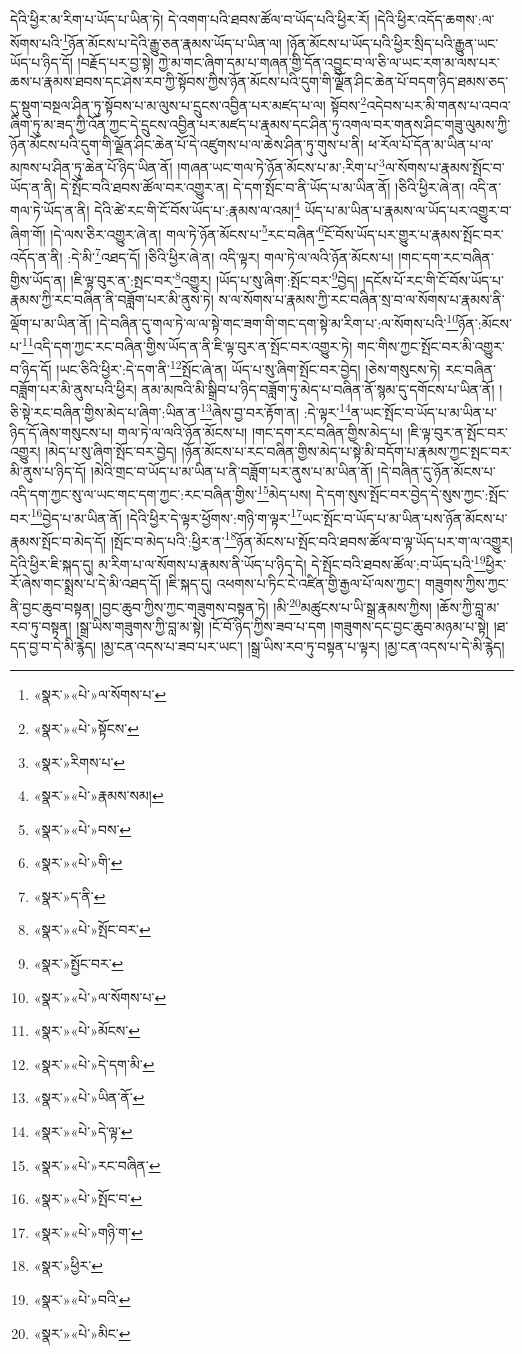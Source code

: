 དེའི་ཕྱིར་མ་རིག་པ་ཡོད་པ་ཡིན་ཏེ། དེ་འགག་པའི་ཐབས་ཚོལ་བ་ཡོད་པའི་ཕྱིར་རོ། །དེའི་ཕྱིར་འདོད་ཆགས་:ལ་སོགས་པའི་\footnote{«སྣར་»«པེ་»ལ་སོགས་པ་}ཉོན་མོངས་པ་དེའི་རྒྱུ་ཅན་རྣམས་ཡོད་པ་ཡིན་ལ། །ཉོན་མོངས་པ་ཡོད་པའི་ཕྱིར་སྲིད་པའི་རྒྱུན་ཡང་ཡོད་པ་ཉིད་དོ། །བརྗོད་པར་བྱ་སྟེ། ཀྱེ་མ་གང་ཞིག་དམ་པ་གཞན་གྱི་དོན་འབྱུང་བ་ལ་ཅི་ལ་ཡང་རག་མ་ལས་པར་ཆས་པ་རྣམས་ཐབས་དང་ཤེས་རབ་ཀྱི་སྟོབས་ཀྱིས་ཉོན་མོངས་པའི་དུག་གི་ལྗོན་ཤིང་ཆེན་པོ་བདག་ཉིད་ཐམས་ཅད་དུ་སྡུག་བསྔལ་ཤིན་ཏུ་སྟོབས་པ་མ་ལུས་པ་དྲུངས་འབྱིན་པར་མཛད་པ་ལ། སྟོབས་\footnote{«སྣར་»«པེ་»སྟོངས་}འདེབས་པར་མི་གནས་པ་འབའ་ཞིག་ཏུ་མ་ཟད་ཀྱི་འོན་ཀྱང་དེ་དྲུངས་འབྱིན་པར་མཛད་པ་རྣམས་དང་ཤིན་ཏུ་འགལ་བར་གནས་ཤིང་གཟུ་ལུམས་ཀྱི་ཉོན་མོངས་པའི་དུག་གི་ལྗོན་ཤིང་ཆེན་པོ་དེ་འཛུགས་པ་ལ་ཆེས་ཤིན་ཏུ་གུས་པ་ནི། ཕ་རོལ་པོ་དོན་མ་ཡིན་པ་ལ་མཁས་པ་ཤིན་ཏུ་ཆེན་པོ་ཉིད་ཡིན་ནོ། །གཞན་ཡང་གལ་ཏེ་ཉོན་མོངས་པ་མ་:རིག་པ་\footnote{«སྣར་»རིགས་པ་}ལ་སོགས་པ་རྣམས་སྤོང་བ་ཡོད་ན་ནི། དེ་སྤོང་བའི་ཐབས་ཚོལ་བར་འགྱུར་ན། དེ་དག་སྤོང་བ་ནི་ཡོད་པ་མ་ཡིན་ནོ། །ཅིའི་ཕྱིར་ཞེ་ན། འདི་ན་གལ་ཏེ་ཡོད་ན་ནི། དེའི་ཚེ་རང་གི་ངོ་བོས་ཡོད་པ་:རྣམས་ལ་འམ།\footnote{«སྣར་»«པེ་»རྣམས་སམ།} ཡོད་པ་མ་ཡིན་པ་རྣམས་ལ་ཡོད་པར་འགྱུར་བ་ཞིག་གོ། །དེ་ལས་ཅིར་འགྱུར་ཞེ་ན། གལ་ཏེ་ཉོན་མོངས་པ་\footnote{«སྣར་»«པེ་»བས་}རང་བཞིན་\footnote{«སྣར་»«པེ་»གི་}ངོ་བོས་ཡོད་པར་གྱུར་པ་རྣམས་སྤོང་བར་འདོད་ན་ནི། :དེ་མི་\footnote{«སྣར་»ད་ནི་}འཐད་དོ། །ཅིའི་ཕྱིར་ཞེ་ན། འདི་ལྟར། གལ་ཏེ་ལ་ལའི་ཉོན་མོངས་པ། །གང་དག་རང་བཞིན་གྱིས་ཡོད་ན། །ཇི་ལྟ་བུར་ན་:སྤང་བར་\footnote{«སྣར་»«པེ་»སྤོང་བར་}འགྱུར། །ཡོད་པ་སུ་ཞིག་:སྤོང་བར་\footnote{«སྣར་»སྤྱོང་བར་}བྱེད། །དངོས་པོ་རང་གི་ངོ་བོས་ཡོད་པ་རྣམས་ཀྱི་རང་བཞིན་ནི་བཟློག་པར་མི་ནུས་ཏེ། ས་ལ་སོགས་པ་རྣམས་ཀྱི་རང་བཞིན་སྲ་བ་ལ་སོགས་པ་རྣམས་ནི་ལྡོག་པ་མ་ཡིན་ནོ། །དེ་བཞིན་དུ་གལ་ཏེ་ལ་ལ་སྟེ་གང་ཟག་གི་གང་དག་སྟེ་མ་རིག་པ་:ལ་སོགས་པའི་\footnote{«སྣར་»«པེ་»ལ་སོགས་པ་}ཉོན་:མོངས་པ་\footnote{«སྣར་»«པེ་»མོངས་}འདི་དག་ཀྱང་རང་བཞིན་གྱིས་ཡོད་ན་ནི་ཇི་ལྟ་བུར་ན་སྤོང་བར་འགྱུར་ཏེ། གང་གིས་ཀྱང་སྤོང་བར་མི་འགྱུར་བ་ཉིད་དོ། །ཡང་ཅིའི་ཕྱིར་:དེ་དག་ནི་\footnote{«སྣར་»«པེ་»དེ་དག་མི་}སྤོང་ཞེ་ན། ཡོད་པ་སུ་ཞིག་སྤོང་བར་བྱེད། །ཅེས་གསུངས་ཏེ། རང་བཞིན་བཟློག་པར་མི་ནུས་པའི་ཕྱིར། ནམ་མཁའི་མི་སྒྲིབ་པ་ཉིད་བཟློག་ཏུ་མེད་པ་བཞིན་ནོ་སྙམ་དུ་དགོངས་པ་ཡིན་ནོ། །ཅི་སྟེ་རང་བཞིན་གྱིས་མེད་པ་ཞིག་:ཡིན་ན་\footnote{«སྣར་»«པེ་»ཡིན་ནོ་}ཞེས་བྱ་བར་རྟོག་ན། :དེ་ལྟར་\footnote{«སྣར་»«པེ་»དེ་ལྟ་}ན་ཡང་སྤོང་བ་ཡོད་པ་མ་ཡིན་པ་ཉིད་དོ་ཞེས་གསུངས་པ། གལ་ཏེ་ལ་ལའི་ཉོན་མོངས་པ། །གང་དག་རང་བཞིན་གྱིས་མེད་པ། །ཇི་ལྟ་བུར་ན་སྤོང་བར་འགྱུར། །མེད་པ་སུ་ཞིག་སྤོང་བར་བྱེད། །ཉོན་མོངས་པ་རང་བཞིན་གྱིས་མེད་པ་སྟེ་མི་བདོག་པ་རྣམས་ཀྱང་སྤང་བར་མི་ནུས་པ་ཉིད་དོ། །མེའི་གྲང་བ་ཡོད་པ་མ་ཡིན་པ་ནི་བཟློག་པར་ནུས་པ་མ་ཡིན་ནོ། །དེ་བཞིན་དུ་ཉོན་མོངས་པ་འདི་དག་ཀྱང་སུ་ལ་ཡང་གང་དག་ཀྱང་:རང་བཞིན་གྱིས་\footnote{«སྣར་»«པེ་»རང་བཞིན་}མེད་པས། དེ་དག་སུས་སྤོང་བར་བྱེད་དེ་སུས་ཀྱང་:སྤོང་བར་\footnote{«སྣར་»«པེ་»སྤོང་བ་}བྱེད་པ་མ་ཡིན་ནོ། །དེའི་ཕྱིར་དེ་ལྟར་ཕྱོགས་:གཉི་ག་ལྟར་\footnote{«སྣར་»«པེ་»གཉི་ག་}ཡང་སྤོང་བ་ཡོད་པ་མ་ཡིན་པས་ཉོན་མོངས་པ་རྣམས་སྤོང་བ་མེད་དོ། །སྤོང་བ་མེད་པའི་:ཕྱིར་ན་\footnote{«སྣར་»ཕྱིར་}ཉོན་མོངས་པ་སྤོང་བའི་ཐབས་ཚོལ་བ་ལྟ་ཡོད་པར་ག་ལ་འགྱུར། དེའི་ཕྱིར་ཇི་སྐད་དུ། མ་རིག་པ་ལ་སོགས་པ་རྣམས་ནི་ཡོད་པ་ཉིད་དེ། དེ་སྤོང་བའི་ཐབས་ཚོལ་:བ་ཡོད་པའི་\footnote{«སྣར་»«པེ་»བའི་}ཕྱིར་རོ་ཞེས་གང་སྨྲས་པ་དེ་མི་འཐད་དོ། །ཇི་སྐད་དུ། འཕགས་པ་ཏིང་ངེ་འཛིན་གྱི་རྒྱལ་པོ་ལས་ཀྱང་། གཟུགས་ཀྱིས་ཀྱང་ནི་བྱང་ཆུབ་བསྟན། །བྱང་ཆུབ་ཀྱིས་ཀྱང་གཟུགས་བསྟན་ཏེ། །མི་\footnote{«སྣར་»«པེ་»མིང་}མཚུངས་པ་ཡི་སྒྲ་རྣམས་ཀྱིས། །ཆོས་ཀྱི་བླ་མ་རབ་ཏུ་བསྟན། །སྒྲ་ཡིས་གཟུགས་ཀྱི་བླ་མ་སྟེ། །ངོ་བོ་ཉིད་ཀྱིས་ཟབ་པ་དག །གཟུགས་དང་བྱང་ཆུབ་མཉམ་པ་སྟེ། །ཐ་དད་བྱ་བ་དེ་མི་རྙེད། །མྱ་ངན་འདས་པ་ཟབ་པར་ཡང་། །སྒྲ་ཡིས་རབ་ཏུ་བསྟན་པ་ལྟར། །མྱ་ངན་འདས་པ་དེ་མི་རྙེད། 